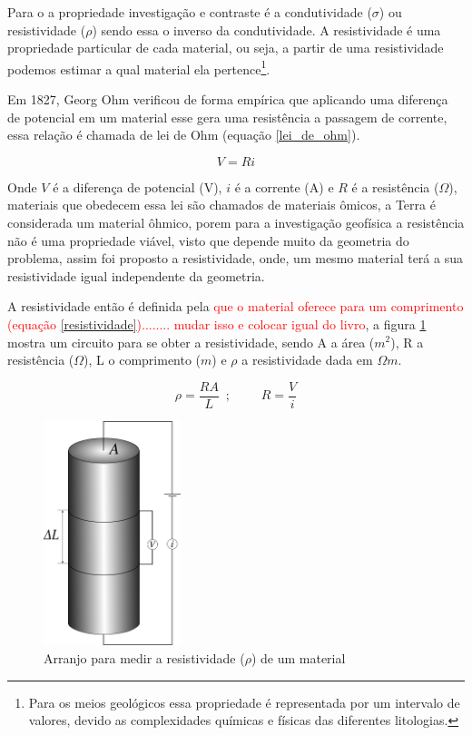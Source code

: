     Para o \MT a propriedade investigação e contraste é a condutividade ($\sigma$) ou resistividade ($\rho$) sendo essa o inverso da condutividade.
    A resistividade é uma propriedade particular de cada material, ou seja, a partir de uma resistividade podemos estimar a qual material ela pertence\footnote{Para os meios geológicos essa propriedade é representada por um intervalo de valores, devido as complexidades químicas e físicas das diferentes litologias.}.
    
    Em 1827, Georg Ohm verificou de forma empírica que aplicando uma diferença de potencial em um material esse gera uma resistência a passagem de corrente, essa relação é chamada de lei de Ohm (equação \ref{lei_de_ohm})\cite{eletromag8hayt}.
    
    \begin{equation}
     \label{lei_de_ohm}
     V = R i
    \end{equation}
    
    Onde $V$ é a diferença de potencial (V), $i$ é a corrente (A) e $R$ é a resistência ($\Omega$), materiais que obedecem essa lei são chamados de materiais ômicos, a Terra é considerada um material ôhmico, porem para a investigação geofísica a resistência não é uma propriedade viável, visto  que depende muito da geometria do problema, assim foi proposto a resistividade, onde, um mesmo material terá a sua resistividade igual independente da geometria.
    
    A resistividade então é definida pela \textcolor{red}{ que o material oferece para um comprimento (equação \ref{resistividade})........ mudar isso e colocar igual do livro}, a figura \ref{fig_resistividade} mostra um circuito para se obter a resistividade, sendo A a área ($m^2$), R a resistência ($\Omega$), L o comprimento ($m$) e $\rho$ a resistividade dada em $\Omega m$. 
    
    \begin{equation}
        \label{resistividade}
        \rho = \dfrac{R A}{L}\, \, \, ;\, \, \, \, \, \, \, \, \, \, \, \, \, \,  R = \dfrac{V}{i}
    \end{equation}
    
    
    \begin{figure}[h]
        \centering
        \caption{Arranjo para medir a resistividade ($\rho$) de um material}
        \centerline{\includegraphics[width=4cm]{texto/fig/resisti_telford.png}}
        \label{fig_resistividade}
    \end{figure}
    
